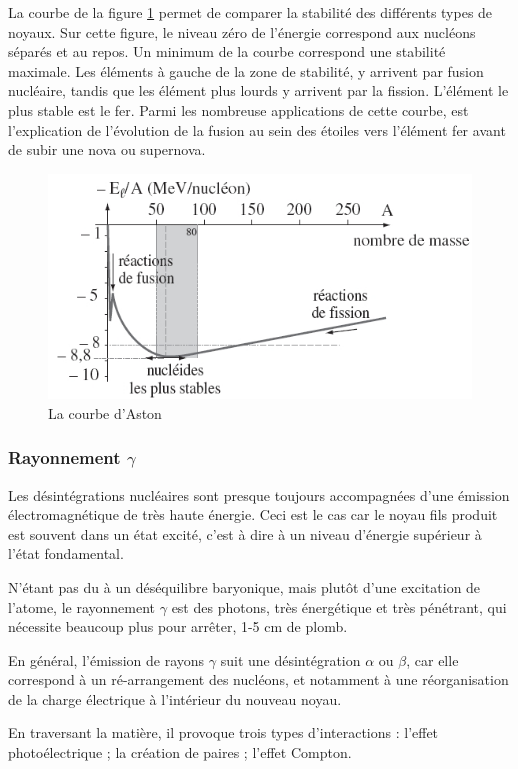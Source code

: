 \documentclass[11pt,a4paper]{article}
\begin{document}
\begin{rmrq}
La courbe de la figure \ref{fig:aston} permet de comparer la stabilité des différents types de noyaux.
Sur cette figure, le niveau zéro de l’énergie correspond aux nucléons séparés et au repos. Un minimum de la courbe correspond une stabilité maximale. Les éléments à gauche de la zone de stabilité, y arrivent par fusion nucléaire, tandis que les élément plus lourds y arrivent par la fission. L'élément le plus stable est le fer. Parmi les nombreuse applications de cette courbe, est l'explication de l'évolution de la fusion au sein des étoiles vers l'élément fer avant de subir une nova ou supernova.
\begin{figure}[H]
\centering
\includegraphics[width=0.85\linewidth]{imgs/p8/aston.jpg}
\caption{La courbe d'Aston}
\label{fig:aston}
\end{figure}
\end{rmrq}


\subsubsection{Rayonnement $\gamma$}
Les désintégrations nucléaires sont presque toujours accompagnées d'une émission électromagnétique de très haute énergie. Ceci est le cas car le noyau fils produit est souvent dans un état excité, c'est à dire à un niveau d'énergie supérieur à l'état fondamental. 

\begin{rmrq}
N'étant pas du à un déséquilibre baryonique, mais plutôt d'une excitation de l'atome, le rayonnement $\gamma$ est des photons, très énergétique et très pénétrant, qui nécessite beaucoup plus pour arrêter, 1-5 cm de plomb. 

En général, l'émission de rayons $\gamma$ suit une désintégration $\alpha$ ou $\beta$, car elle correspond à un ré-arrangement des nucléons, et notamment à une réorganisation de la charge électrique à l'intérieur du nouveau noyau.

En traversant la matière, il provoque trois types d'interactions :
l'effet photoélectrique ; la création de paires ; l'effet Compton.
\end{rmrq}
\end{document}
